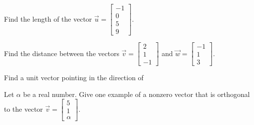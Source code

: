 \documentclass[12pt]{exam}
\begin{document}
\begin{questions}

\question[5]
Find the length of the vector $\vec{u} = \left[ \begin{array}{c} -1 \\ 0 \\ 5 \\ 9 \end{array} \right]$.

\question[5]
Find the distance between the vectors 
$\vec{v} = \left[ \begin{array}{c} 2 \\ 1 \\ -1  \end{array} \right]$ and 
$\vec{w} = \left[ \begin{array}{c} -1 \\ 1 \\ 3 \end{array} \right]$. 

\clearpage
\question[8]
Find a unit vector pointing in the direction of
\begin{parts}
\end{parts}

\question[6]
Let $\alpha$ be a real number.  Give one example of a nonzero vector that is orthogonal to the vector
$\vec{v} = \left[ \begin{array}{c} 5 \\ 1 \\ \alpha  \end{array} \right]$.


\end{questions}
\end{document}
